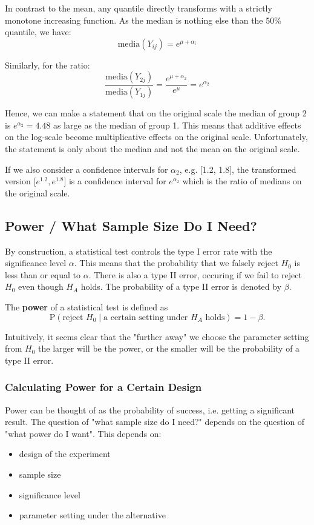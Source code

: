 In contrast to the mean, any quantile directly transforms with a strictly monotone increasing function. As the median is nothing else than the 50\% quantile, we have:
$$\text{media}(Y_{ij}) = e^{\mu + \alpha_i}$$

Similarly, for the ratio:
$$\frac{\text{media}(Y_{2j})}{\text{media}(Y_{1j})} = \frac{e^{\mu + \alpha_2}}{e^{\mu}} = e^{\alpha_2}$$

Hence, we can make a statement that on the original scale the median of group 2 is $e^{\alpha_2} = 4.48$ as large as the median of group 1. This means that additive effects on the log-scale become multiplicative effects on the original scale. Unfortunately, the statement is only about the median and not the mean on the original scale. \medskip

If we also consider a confidence intervals for $\alpha_2$, e.g. [1.2, 1.8], the transformed version [$e^{1.2}, e^{1.8}$] is a confidence interval for $e^{\alpha_2}$ which is the ratio of medians on the original scale.

\subsection{Power / What Sample Size Do I Need?}

By construction, a statistical test controls the type I error rate with the significance level $\alpha$. This means that the probability that we falsely reject $H_0$ is less than or equal to $\alpha$. There is also a type II error, occuring if we fail to reject $H_0$ even though $H_A$ holds. The probability of a type II error is denoted by $\beta$. \medskip

The \textbf{power} of a statistical test is defined as 
$$\text{P}(\text{reject } H_0 \; | \; \text{a certain setting under } H_A \text{ holds}) = 1 - \beta.$$

Intuitively, it seems clear that the "further away" we choose the parameter setting from $H_0$ the larger will be the power, or the smaller will be the probability of a type II error.

\subsubsection{Calculating Power for a Certain Design}

Power can be thought of as the probability of success, i.e. getting a significant result. The question of "what sample size do I need?" depends on the question of "what power do I want". This depends on:
\begin{itemize}
	\item design of the experiment
	\item sample size
	\item significance level
	\item parameter setting under the alternative
\end{itemize}

